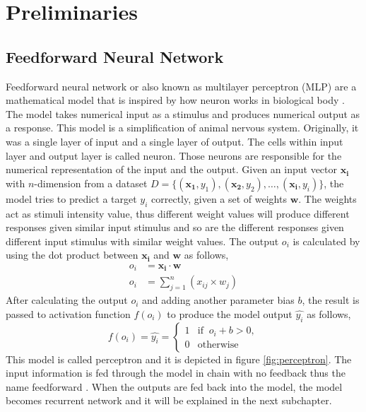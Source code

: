 \chapter{Preliminaries}
\label{chap:preliminaries}

\section{Feedforward Neural Network}
    Feedforward neural network or also known as multilayer perceptron
    (MLP) are a mathematical model that is inspired by how neuron
    works in biological body \citep{Goodfellow-et-al-2016}. The model
    takes numerical input as a stimulus and produces numerical output
    as a response. This model is a simplification of animal nervous
    system. Originally, it was a single layer of input and a single
    layer of output. The cells within input layer and output layer is
    called neuron. Those neurons are responsible for the numerical
    representation of the input and the output. Given an input vector
    $\mathbf{x_i}$ with $n$-dimension from a dataset $D =
    \{(\mathbf{x_1}, y_1), (\mathbf{x_2}, y_2), \dots, (\mathbf{x_i},
    y_i)\}$, the model tries to predict a target $y_i$ correctly, given
    a set of weights $\mathbf{w}$. The weights act as stimuli
    intensity value, thus different weight values will produce
    different responses given similar input stimulus and so are the
    different responses given different input stimulus with similar
    weight values. The output $o_i$ is calculated by using the dot
    product between $\mathbf{x_i}$ and $\mathbf{w}$ as follows, 
    \begin{align}
        \label{eq:perceptron_out}
        o_i &= \mathbf{x_i} \cdot \mathbf{w} \\
        o_i &= \sum_{j=1}^n (x_{ij} \times w_j)
    \end{align}
    After calculating the output $o_i$ and adding another parameter bias $b$, 
    the result is passed to activation function $f(o_i)$ to
    produce the model output $\hat{y_i}$ as follows,
    \begin{equation}
        \label{eq:perceptron_act}
        f(o_i) = \hat{y_i} =
        \begin{cases}
            1 & \text{if }\ o_i + b > 0,\\
            0 & \text{otherwise}
        \end{cases}
    \end{equation}
    This model is called perceptron and it is depicted in figure
    \ref{fig:perceptron}. The input information is fed through the model
    in chain with no feedback thus the name feedforward
    \citep{Goodfellow-et-al-2016}. When the outputs are fed back into
    the model, the model becomes recurrent network and it will be
    explained in the next subchapter.

